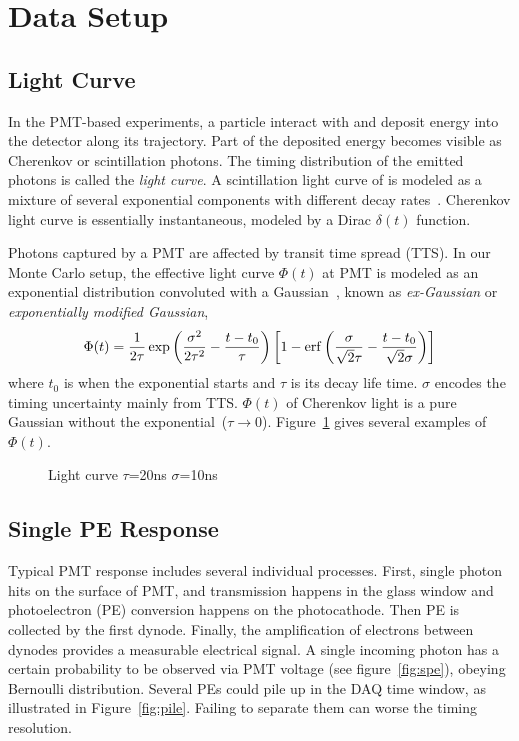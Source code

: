 \section{Data Setup} %
\label{sec:toyMC}

\subsection{Light Curve}
In the PMT-based experiments, a particle interact with and deposit energy into the detector along its trajectory. Part of the deposited energy becomes visible as Cherenkov or scintillation photons.  The timing distribution of the emitted photons is called the \textit{light curve}.  A scintillation light curve of is modeled as a mixture of several exponential components with different decay rates~\cite{ludhova_particle_2020}.  Cherenkov light curve is essentially instantaneous, modeled by a Dirac $\delta(t)$ function.

Photons captured by a PMT are affected by transit time spread (TTS).  In our Monte Carlo setup, the effective light curve $\Phi(t)$ at PMT is modeled as an exponential distribution convoluted with a Gaussian~\cite{li_separation_2016}, known as \textit{ex-Gaussian} or \textit{exponentially modified Gaussian},
\begin{align}
    \Phi(t) = \frac{1}{2\tau} \exp\left(\frac{\sigma^2}{2\tau^2}-\frac{t-t_0}{\tau}\right) \left[1 - \operatorname{erf}\left( \frac{\sigma}{\sqrt{2}\tau} - \frac{t-t_0}{\sqrt{2}\sigma} \right)\right]
    \label{eq:time-pro}
\end{align}
where $t_0$ is when the exponential starts and $\tau$ is its decay life time.  $\sigma$ encodes the timing uncertainty mainly from TTS.  $\Phi(t)$ of Cherenkov light is a pure Gaussian without the exponential~($\tau\to0$).  Figure~\ref{fig:time-pro} gives several examples of $\Phi(t)$.

\begin{figure}
  \centering
  \resizebox{0.6\textwidth}{!}{}
  \caption{\label{fig:time-pro} Light curve $\tau$=20ns $\sigma$=10ns}
\end{figure}

\subsection{Single PE Response}

Typical PMT response includes several individual processes. First, single photon hits on the surface of PMT, and transmission happens in the glass window and photoelectron (PE) conversion happens on the photocathode. Then PE is collected by the first dynode. Finally, the amplification of electrons between dynodes provides a measurable electrical signal. A single incoming photon has a certain probability to be observed via PMT voltage (see figure~\ref{fig:spe}), obeying Bernoulli distribution. Several PEs could pile up in the DAQ time window, as illustrated in Figure~\ref{fig:pile}.  Failing to separate them can worse the timing resolution.

